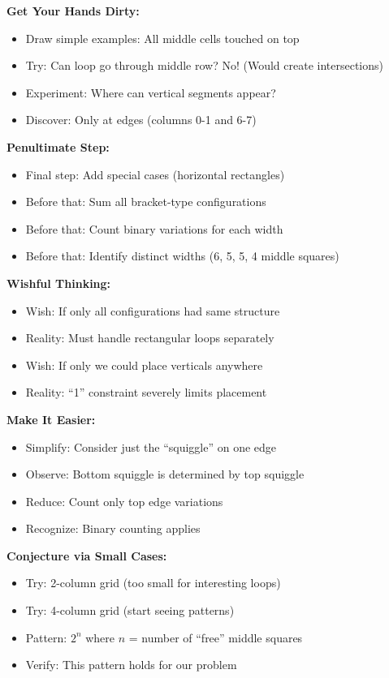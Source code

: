 \documentclass[12pt]{article}
\begin{document}
\begin{strategicbox}
\textbf{Get Your Hands Dirty:}
\begin{itemize}
    \item Draw simple examples: All middle cells touched on top
    \item Try: Can loop go through middle row? No! (Would create intersections)
    \item Experiment: Where can vertical segments appear?
    \item Discover: Only at edges (columns 0-1 and 6-7)
\end{itemize}

\textbf{Penultimate Step:}
\begin{itemize}
    \item Final step: Add special cases (horizontal rectangles)
    \item Before that: Sum all bracket-type configurations
    \item Before that: Count binary variations for each width
    \item Before that: Identify distinct widths (6, 5, 5, 4 middle squares)
\end{itemize}

\textbf{Wishful Thinking:}
\begin{itemize}
    \item Wish: If only all configurations had same structure
    \item Reality: Must handle rectangular loops separately
    \item Wish: If only we could place verticals anywhere
    \item Reality: ``1'' constraint severely limits placement
\end{itemize}

\textbf{Make It Easier:}
\begin{itemize}
    \item Simplify: Consider just the ``squiggle'' on one edge
    \item Observe: Bottom squiggle is determined by top squiggle
    \item Reduce: Count only top edge variations
    \item Recognize: Binary counting applies
\end{itemize}

\textbf{Conjecture via Small Cases:}
\begin{itemize}
    \item Try: 2-column grid (too small for interesting loops)
    \item Try: 4-column grid (start seeing patterns)
    \item Pattern: $2^n$ where $n$ = number of ``free'' middle squares
    \item Verify: This pattern holds for our problem
\end{itemize}


\end{strategicbox}
\end{document}
